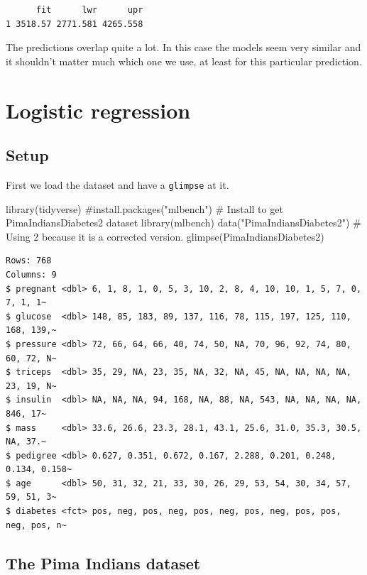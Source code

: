 \documentclass[
  letterpaper,
  DIV=11,
  numbers=noendperiod]{scrreprt}
\newenvironment{Shaded}{\begin{snugshade}}{\end{snugshade}}
\newcommand{\CommentTok}[1]{\textcolor[rgb]{0.37,0.37,0.37}{#1}}
\newcommand{\FunctionTok}[1]{\textcolor[rgb]{0.28,0.35,0.67}{#1}}
\newcommand{\NormalTok}[1]{\textcolor[rgb]{0.00,0.23,0.31}{#1}}
\newcommand{\StringTok}[1]{\textcolor[rgb]{0.13,0.47,0.30}{#1}}
\begin{document}
\begin{verbatim}
      fit      lwr      upr
1 3518.57 2771.581 4265.558
\end{verbatim}

The predictions overlap quite a lot. In this case the models seem very
similar and it shouldn't matter much which one we use, at least for this
particular prediction.

\chapter{Logistic regression}\label{logistic-regression-1}

\section{Setup}\label{setup-3}

First we load the dataset and have a \texttt{glimpse} at it.

\begin{Shaded}
\begin{Highlighting}[]
\FunctionTok{library}\NormalTok{(tidyverse)}
\CommentTok{\#install.packages("mlbench") \# Install to get PimaIndiansDiabetes2 dataset}
\FunctionTok{library}\NormalTok{(mlbench)}
\FunctionTok{data}\NormalTok{(}\StringTok{"PimaIndiansDiabetes2"}\NormalTok{) }\CommentTok{\# Using 2 because it is a corrected version.}
\FunctionTok{glimpse}\NormalTok{(PimaIndiansDiabetes2)}
\end{Highlighting}
\end{Shaded}

\begin{verbatim}
Rows: 768
Columns: 9
$ pregnant <dbl> 6, 1, 8, 1, 0, 5, 3, 10, 2, 8, 4, 10, 10, 1, 5, 7, 0, 7, 1, 1~
$ glucose  <dbl> 148, 85, 183, 89, 137, 116, 78, 115, 197, 125, 110, 168, 139,~
$ pressure <dbl> 72, 66, 64, 66, 40, 74, 50, NA, 70, 96, 92, 74, 80, 60, 72, N~
$ triceps  <dbl> 35, 29, NA, 23, 35, NA, 32, NA, 45, NA, NA, NA, NA, 23, 19, N~
$ insulin  <dbl> NA, NA, NA, 94, 168, NA, 88, NA, 543, NA, NA, NA, NA, 846, 17~
$ mass     <dbl> 33.6, 26.6, 23.3, 28.1, 43.1, 25.6, 31.0, 35.3, 30.5, NA, 37.~
$ pedigree <dbl> 0.627, 0.351, 0.672, 0.167, 2.288, 0.201, 0.248, 0.134, 0.158~
$ age      <dbl> 50, 31, 32, 21, 33, 30, 26, 29, 53, 54, 30, 34, 57, 59, 51, 3~
$ diabetes <fct> pos, neg, pos, neg, pos, neg, pos, neg, pos, pos, neg, pos, n~
\end{verbatim}

\section{The Pima Indians dataset}\label{the-pima-indians-dataset-1}
\end{document}
